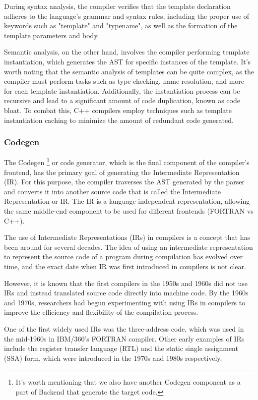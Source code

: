 During syntax analysis, the compiler verifies that the template declaration
adheres to the language's grammar and syntax rules, including the proper use of
keywords such as "template" and "typename", as well as the formation of the
template parameters and body. 

Semantic analysis, on the other hand, involves the compiler performing template
instantiation, which generates the AST for specific instances of the
template. It's worth noting that the semantic analysis of templates can be quite
complex, as the compiler must perform tasks such as type checking, name
resolution, and more for each template instantiation. Additionally, the
instantiation process can be recursive and lead to a significant amount of code
duplication, known as code bloat. To combat this, C++ compilers employ
techniques such as template instantiation caching to minimize the amount of
redundant code generated. 

\subsubsection{Codegen}
The Codegen
\footnote{
It's worth mentioning that we also have another Codegen component as a part of
Backend that generate the target code.
}
or code generator,
which is the final component of the compiler's frontend, has the primary goal of
generating the Intermediate Representation (IR). For this purpose, the compiler
traverses the AST generated by the parser and converts it into another source
code that is called the Intermediate Representation or IR. The IR is a
language-independent representation, allowing the same middle-end component to
be used for different frontends (FORTRAN vs C++). 

The use of Intermediate Representations (IRs) in compilers is a concept that has
been around for several decades. The idea of using an intermediate
representation to represent the source code of a program during compilation has
evolved over time, and the exact date when IR was first introduced in compilers
is not clear. 

However, it is known that the first compilers in the 1950s and 1960s did not use
IRs and instead translated source code directly into machine code. By the 1960s
and 1970s, researchers had begun experimenting with using IRs in compilers to
improve the efficiency and flexibility of the compilation process. 

One of the first widely used IRs was the three-address code, which was used in
the mid-1960s in IBM/360's FORTRAN compiler. Other early examples of IRs include
the register transfer language (RTL) and the static single assignment (SSA)
form, which were introduced in the 1970s and 1980s respectively. 

